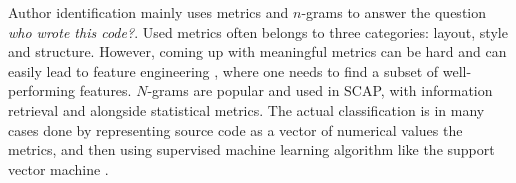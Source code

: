 Author identification mainly uses metrics and $n$-grams to answer the question \emph{who wrote this code?}. Used metrics often belongs to three categories: layout, style and structure. However, coming up with meaningful metrics can be hard and can easily lead to feature engineering \cite{EJPFSAI2004}, where one needs to find a subset of well-performing features. $N$-grams are popular and used in SCAP, with information retrieval and alongside statistical metrics. The actual classification is in many cases done by representing source code as a vector of numerical values \ie the metrics, and then using supervised machine learning algorithm like the support vector machine \cite{SDNAIJSP2015}. 



